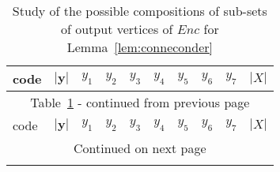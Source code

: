 \documentclass[a4paper,UKenglish]{lipics-v2016}
\begin{document}
	\begin{longtable}[c]{|p{}||p{}||p{} p{} p{} p{} p{} p{} p{}|p{}|}
		\caption{Study of the possible compositions of sub-sets of output vertices of $Enc$ for Lemma~\ref{lem:conneconder}}\label{table:configurations}\\ 
		\hline
		code & $|\textbf{y}|$ & $y_1$ & $y_2$ & $y_3$ & $y_4$ & $y_5$ & $y_6$ & $y_7$ &  $|X|$ \\\hline
		\endfirsthead
		\hline
		\multicolumn{10}{|c|}{{Table~\ref{table:configurations} - continued from previous page}}\\\hline
		code & $|\textbf{y}|$ & $y_1$ & $y_2$ & $y_3$ & $y_4$ & $y_5$ & $y_6$ & $y_7$ & $|X|$ \\\hline
		\endhead
		
		\hline
		\multicolumn{10}{|c|}{{Continued on next page}}\\\hline
		\endfoot	
		

\end{longtable}
\end{document}
